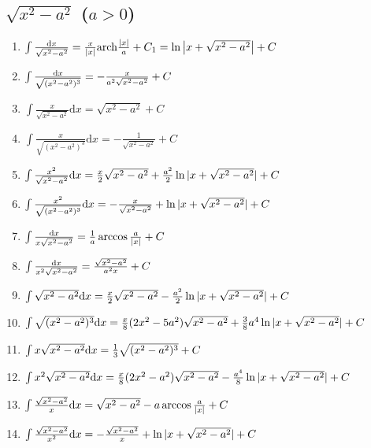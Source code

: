 	\subsection{$\sqrt{x^2-a^2}$ ($a>0$)}

	\begin{enumerate}

	\item $ \int \frac{\mathrm{d} x}{\sqrt{x^2-a^2}} = \frac{x}{|x|} \mathrm{arch} \frac{|x|}{a} + C_1 = \ln\left|x+\sqrt{x^2-a^2}\right| + C $

	\item $ \int \frac{\mathrm{d} x}{\sqrt{(x^2-a^2)^3}} = -\frac{x}{a^2\sqrt{x^2-a^2}} + C$

	\item $ \int \frac{x}{\sqrt{x^2-a^2}} \mathrm{d}x = \sqrt{x^2-a^2} + C $

	\item $ \int \frac{x}{\sqrt{(x^2-a^2)^3}} \mathrm{d}x = -\frac{1}{\sqrt{x^2-a^2}} + C $

	\item $ \int \frac{x^2}{\sqrt{x^2-a^2}} \mathrm{d} x = \frac{x}{2}\sqrt{x^2-a^2} + \frac{a^2}{2}\ln|x+\sqrt{x^2-a^2}| + C $

	\item $ \int \frac{x^2}{\sqrt{(x^2-a^2)^3}} \mathrm{d} x = -\frac{x}{\sqrt{x^2-a^2}} + \ln|x+\sqrt{x^2-a^2}| + C $

	\item $ \int \frac{\mathrm{d} x}{x\sqrt{x^2-a^2}} = \frac{1}{a} \arccos \frac{a}{|x|} + C $

	\item $ \int \frac{\mathrm{d} x}{x^2\sqrt{x^2-a^2}} = \frac{\sqrt{x^2-a^2}}{a^2x} + C $

	\item $ \int \sqrt{x^2-a^2} \mathrm{d} x = \frac{x}{2}\sqrt{x^2-a^2} - \frac{a^2}{2}\ln|x + \sqrt{x^2-a^2}| + C $

	\item $ \int \sqrt{(x^2-a^2)^3} \mathrm{d} x = \frac{x}{8}(2x^2-5a^2)\sqrt{x^2-a^2} + \frac{3}{8}a^4\ln|x + \sqrt{x^2-a^2}| + C $

	\item $ \int x \sqrt{x^2-a^2} \mathrm{d} x = \frac{1}{3} \sqrt{(x^2-a^2)^3} + C $

	\item $ \int x^2\sqrt{x^2-a^2} \mathrm{d} x = \frac{x}{8}(2x^2-a^2)\sqrt{x^2-a^2} - \frac{a^4}{8}\ln|x+\sqrt{x^2-a^2}| + C $

	\item $ \int \frac{\sqrt{x^2-a^2}}{x} \mathrm{d} x = \sqrt{x^2-a^2} - a \arccos\frac{a}{|x|} + C $

	\item $ \int \frac{\sqrt{x^2-a^2}}{x^2} \mathrm{d} x = -\frac{\sqrt{x^2-a^2}}{x} + \ln|x + \sqrt{x^2-a^2}| + C $

	\end{enumerate}

